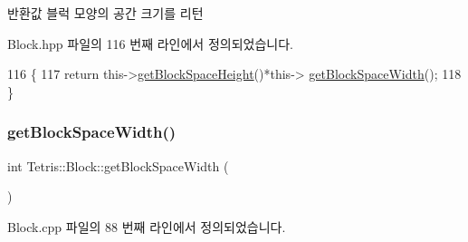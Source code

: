 \begin{DoxyReturn}{반환값}
블럭 모양의 공간 크기를 리턴 
\end{DoxyReturn}


Block.\+hpp 파일의 116 번째 라인에서 정의되었습니다.


\begin{DoxyCode}
116                                    \{
117                 \textcolor{keywordflow}{return} this->\hyperlink{class_tetris_1_1_block_a5301977e32c03aaf122fa289fcba77ba}{getBlockSpaceHeight}()*this->
      \hyperlink{class_tetris_1_1_block_ac390e14de476582300d815d9054ed9bd}{getBlockSpaceWidth}();
118             \}
\end{DoxyCode}
\mbox{\label{class_tetris_1_1_block_ac390e14de476582300d815d9054ed9bd}} 
\subsubsection{\texorpdfstring{get\+Block\+Space\+Width()}{getBlockSpaceWidth()}\hspace{0.1cm}{\footnotesize\ttfamily [1/2]}}
{\footnotesize\ttfamily int Tetris\+::\+Block\+::get\+Block\+Space\+Width (\begin{DoxyParamCaption}{ }\end{DoxyParamCaption})}



Block.\+cpp 파일의 88 번째 라인에서 정의되었습니다.


